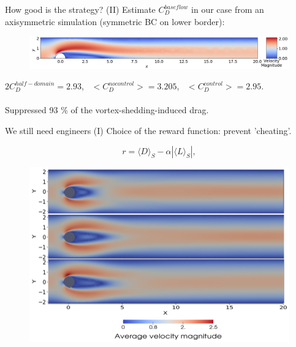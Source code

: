 \documentclass{beamer}
\begin{document}
\begin{frame}{How good is the strategy? (II)}
     Estimate $C_D^{base flow}$ in our case from an axisymmetric simulation (symmetric BC on lower border):
     
     \begin{figure}
    \begin{center}
      \includegraphics[width=.99\textwidth]{Figures/base_flow_half_domain}
    \end{center}
    \end{figure}
    
    $2 C_D^{half-domain} = 2.93$,~ $<C_D^{no control}> = 3.205$,~ $<C_D^{control}> = 2.95$. \\~\\
    
    Suppressed 93 \% of the vortex-shedding-induced drag.
\end{frame}

\begin{frame}{We still need engineers (I)}
    Choice of the reward function: prevent 'cheating'.

\begin{equation} r = \langle D \rangle_{S} - \alpha |\langle L\rangle_{S}|, \label{reward_function} \end{equation}

    \begin{figure}
    \begin{center}
      \includegraphics[width=.75\textwidth]{Figures/fig5_illustration_cheating}
    \end{center}
    \end{figure}
\end{frame}
\end{document}

